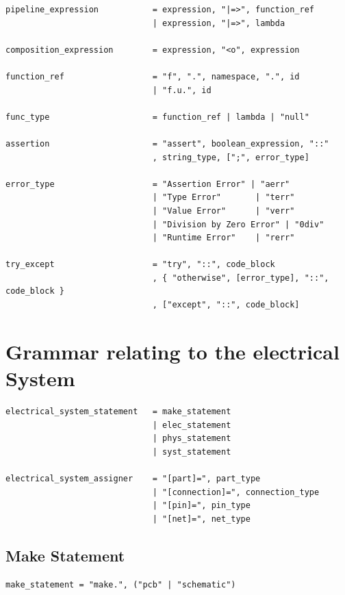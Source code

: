 \begin{verbatim}
pipeline_expression           = expression, "|=>", function_ref
                              | expression, "|=>", lambda

composition_expression        = expression, "<o", expression

function_ref                  = "f", ".", namespace, ".", id
                              | "f.u.", id

func_type                     = function_ref | lambda | "null"

assertion                     = "assert", boolean_expression, "::"
                              , string_type, [";", error_type]

error_type                    = "Assertion Error" | "aerr"
                              | "Type Error"       | "terr"
                              | "Value Error"      | "verr"
                              | "Division by Zero Error" | "0div"
                              | "Runtime Error"    | "rerr"

try_except                    = "try", "::", code_block
                              , { "otherwise", [error_type], "::", code_block }
                              , ["except", "::", code_block]
\end{verbatim}

\newpage
\section{Grammar relating to the electrical System}
\begin{verbatim}
electrical_system_statement   = make_statement
                              | elec_statement
                              | phys_statement
                              | syst_statement

electrical_system_assigner    = "[part]=", part_type
                              | "[connection]=", connection_type
                              | "[pin]=", pin_type
                              | "[net]=", net_type
\end{verbatim}

\subsection{Make Statement}
\begin{verbatim}
make_statement = "make.", ("pcb" | "schematic")
\end{verbatim}


